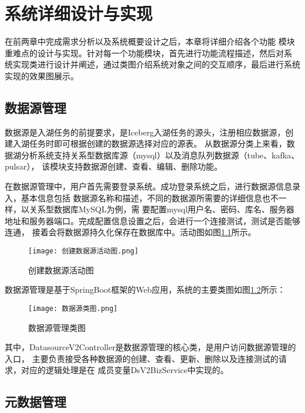 
\chapter{系统详细设计与实现}

在前两章中完成需求分析以及系统概要设计之后，本章将详细介绍各个功能
模块重难点的设计与实现。针对每一个功能模块，首先进行功能流程描述，然后对系
统实现类进行设计并阐述，通过类图介绍系统对象之间的交互顺序，最后进行系统实现的效果图展示。

\section{数据源管理}

数据源是入湖任务的前提要求，是Iceberg入湖任务的源头，注册相应数据源，创建入湖任务时即可根据创建的数据源选择对应的源表。
从数据源分类上来看，数据湖分析系统支持关系型数据库源（mysql）以及消息队列数据源（tube、kafka、pulsar），
该模块支持数据源创建、查看、编辑、删除功能。

在数据源管理中，用户首先需要登录系统。成功登录系统之后，进行数据源信息录入，基本信息包括
数据源名称和描述，不同的数据源所需要的详细信息也不一样，以关系型数据库MySQL为例，需
要配置mysql用户名、密码、库名、服务器地址和服务器端口。完成配置信息设置之后，会进行一个连接测试，测试是否能够连通，
接着会将数据源持久化保存在数据库中。活动图如图\ref{fig:创建数据源活动图}所示。

\begin{figure}[H]
  \centering
  \texttt{[image: 创建数据源活动图.png]}
  \caption{创建数据源活动图}
  \label{fig:创建数据源活动图}
\end{figure}

数据源管理是基于SpringBoot框架的Web应用，系统的主要类图如图\ref{fig:数据源类图}所示：

\begin{figure}[H]
  \centering
  \texttt{[image: 数据源类图.png]}
  \caption{数据源管理类图}
  \label{fig:数据源类图}
\end{figure}

其中，DatasourceV2Controller是数据源管理的核心类，是用户访问数据源管理的入口，
主要负责接受各种数据源的创建、查看、更新、删除以及连接测试的请求，对应的逻辑处理是在
成员变量DsV2BizService中实现的。

\section{元数据管理}

